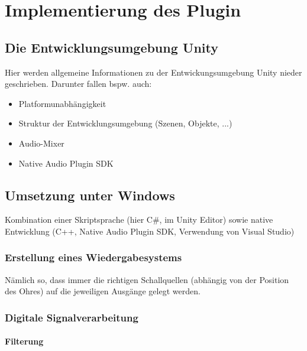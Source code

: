 \chapter[Implementierung des Plugin]{Implementierung des Plugin} \label{chap:IMPL}


\section{Die Entwicklungsumgebung Unity}
\label{sec:4_DEU}

Hier werden allgemeine Informationen zu der Entwickungsumgebung Unity nieder geschrieben. Darunter fallen bspw. auch:

\begin{itemize}
    \item Platformunabhängigkeit
    \item Struktur der Entwicklungsumgebung (Szenen, Objekte, ...)
    \item Audio-Mixer
    \item Native Audio Plugin SDK
\end{itemize}


\section{Umsetzung unter Windows}
\label{sec:4_UUW}

Kombination einer Skriptsprache (hier C\#, im Unity Editor) sowie native Entwicklung (C++, Native Audio Plugin SDK, Verwendung von Visual Studio)

    \subsection{Erstellung eines Wiedergabesystems}
    \label{subsec:4_IDS}
    
    Nämlich so, dass immer die richtigen Schallquellen (abhängig von der Position des Ohres) auf die jeweiligen Ausgänge gelegt werden.
    
    \subsection{Digitale Signalverarbeitung}
    \label{subsec:4_DSV}
    
        \subsubsection{Filterung}
        \label{subsubsec:4_F}
        
